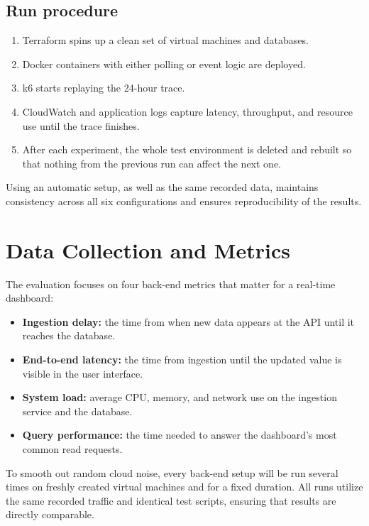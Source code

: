 \documentclass[nomenclature, english, biblatex]{kththesis}
\numberwithin{listing}{chapter}
\begin{document}
\subsection{Run procedure}
\begin{enumerate}[leftmargin=*]
  \item Terraform spins up a clean set of virtual machines and databases.
  \item Docker containers with either polling or event logic are deployed.
  \item k6 starts replaying the 24-hour trace.
  \item CloudWatch and application logs capture latency, throughput, and resource use until the trace finishes.
  \item After each experiment, the whole test environment is deleted and rebuilt so that nothing from the previous run can affect the next one.
\end{enumerate}

\noindent
Using an automatic setup, as well as the same recorded data, maintains consistency across all six configurations and ensures reproducibility of the results.



\section{Data Collection and Metrics}
\label{sec:dataCollection}

The evaluation focuses on four back-end metrics that matter for a
real-time dashboard:

\begin{itemize}[leftmargin=*]
  \item \textbf{Ingestion delay:} the time from when new data appears at the API until it reaches the database.
  \item \textbf{End-to-end latency:} the time from ingestion until the updated value is visible in the user interface.
  \item \textbf{System load:} average CPU, memory, and network use on the ingestion service and the database.
  \item \textbf{Query performance:} the time needed to answer the dashboard's most common read requests.
\end{itemize}

\noindent
To smooth out random cloud noise, every back-end setup will be run several times on freshly created virtual machines and for a fixed duration. All runs utilize the same recorded traffic and identical test scripts, ensuring that results are directly comparable.
\end{document}
